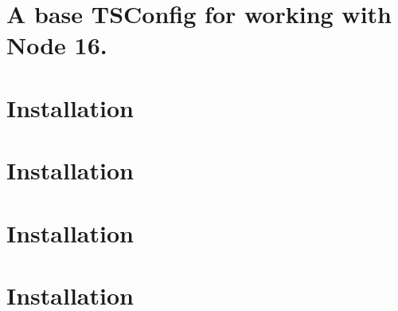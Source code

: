 \documentclass[twoside]{book}
\newcommand{\+}{\discretionary{\mbox{\scriptsize$\hookleftarrow$}}{}{}}
\begin{document}
\chapter{A base TSConfig for working with Node 16.}
\label{md__c___users_vaishnavi_jadhav__desktop__developer_code_mean_stack_example_server_node_modules__tsconfig_node16__r_e_a_d_m_e}

\chapter{Installation}
\label{md__c___users_vaishnavi_jadhav__desktop__developer_code_mean_stack_example_server_node_modules__types_body_parser__r_e_a_d_m_e}

\chapter{Installation}
\label{md__c___users_vaishnavi_jadhav__desktop__developer_code_mean_stack_example_server_node_modules__types_connect__r_e_a_d_m_e}

\chapter{Installation}
\label{md__c___users_vaishnavi_jadhav__desktop__developer_code_mean_stack_example_server_node_modules__types_cors__r_e_a_d_m_e}

\chapter{Installation}
\label{md__c___users_vaishnavi_jadhav__desktop__developer_code_mean_stack_example_server_node_modules__00e58939caa1577ad8795fcdcbed3f0e}

\end{document}

